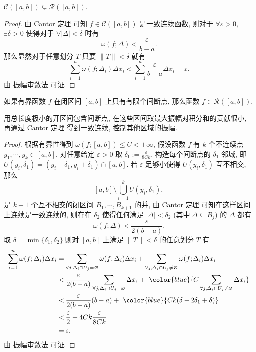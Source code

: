 \documentclass[cn,toc=twocol]{elegantbook}
\newcommand{\ds}{\displaystyle}
\begin{document}
\begin{corollary}
	$\mathscr{C}([a,b]) \subsetneq \mathscr{R}([a,b])$.
\end{corollary}

\begin{proof}
	由 \hyperref[thm:cantor]{Cantor 定理} 可知 $f \in \mathscr{C}([a,b])$ 是一致连续函数, 则对于 $\forall \varepsilon > 0$, $\exists \delta > 0$ 使得对于 $\forall \lvert\Delta\rvert < \delta$ 时有
	\[
		\omega (f; \Delta) < \frac{\varepsilon}{b - a}.
	\]
	那么显然对于任意划分 $T$ 只要 $\lVert T \rVert < \delta$ 就有
	\[
		\sum_{i=1}^n \omega(f;\Delta_i) \Delta x_i < \sum_{i=1}^n \frac{\varepsilon} {b - a}\Delta x_i = \varepsilon.
	\]
	由 \hyperref[thm:darbouxct]{振幅审敛法} 可证.
\end{proof}

\begin{corollary}
	如果有界函数 $f$ 在闭区间 $[a,b]$ 上只有有限个间断点, 那么函数 $f \in \mathscr{R}([a,b])$.
\end{corollary}
\begin{idea*}
	用总长度极小的开区间包含间断点, 在这些区间取最大振幅对积分和的贡献很小, 再通过 \hyperref[thm:cantor]{Cantor 定理} 得到一致连续, 控制其他区域的振幅.
\end{idea*}
\begin{proof}
	根据有界性得到 $\omega(f; [a,b]) \le C < +\infty$, 假设函数 $f$ 有 $k$ 个不连续点 $y_1,\cdots,y_k \in [a,b]$, 对任意给定 $\varepsilon > 0$ 取 $\ds \delta_1 := \frac{\varepsilon}{8Ck}$. 构造每个间断点的 $\delta_1$ 邻域, 即 $U(y_i, \delta_1) = (y_i - \delta_1, y_i + \delta_1) \cap [a,b]$. 若 $\varepsilon$ 足够小使得 $U(y_i,\delta_1)$ 互不相交, 那么
	\[
		[a,b] \setminus \bigcup_{i=1}^k U(y_i,\delta_1),
	\]
	是 $k + 1$ 个互不相交的闭区间 $B_1,\cdots,B_{k+1}$ 的并, 由 \hyperref[thm:cantor]{Cantor 定理} 可知在这样区间上连续是一致连续的, 则存在 $\delta_2$ 使得任何满足 $\lvert \Delta \rvert < \delta_2$ (其中 $\Delta \subseteq B_j$) 的 $\Delta$ 都有
	\[
		\omega(f;\Delta) < \frac{\varepsilon}{2(b-a)}.
	\]
	取 $\delta = \min\{\delta_1,\delta_2\}$ 则对 $[a,b]$ 上满足 $\lVert T \rVert < \delta$ 的任意划分 $T$ 有
	\[
	\begin{aligned}
		\sum_{i=1}^n \omega (f;\Delta_i) \Delta x_i &= \sum_{\forall j, \Delta_i \cap U_j = \varnothing} \omega (f;\Delta_i) \Delta x_i + \sum_{\forall j, \Delta_i \cap U_j \neq \varnothing} \omega (f;\Delta_i) \Delta x_i\\
		&< \frac{\varepsilon}{2(b-a)} \sum_{\forall j, \Delta_i \cap U_j = \varnothing} \Delta x_i +\ \color{blue}{C \sum_{\forall j, \Delta_i \cap U_j \neq \varnothing} \Delta x_i}\\
		&< \frac{\varepsilon}{2(b-a)} (b-a) +\ \color{blue}{Ck(\delta + 2\delta_1 + \delta)}\\
		&< \frac{\varepsilon}{2} + 4Ck\frac{\varepsilon}{8Ck}\\
		&= \varepsilon.
	\end{aligned}
	\]
	由 \hyperref[thm:darbouxct]{振幅审敛法} 可证.
\end{proof}
\end{document}
